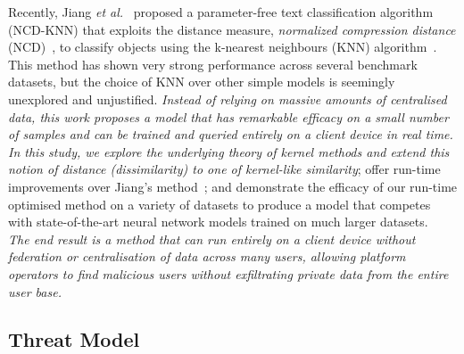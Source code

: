 \documentclass[conference]{IEEEtran}
\newcommand{\cm}[1]{\textit{{\color{blue}#1}}}
\begin{document}
Recently, Jiang \textit{et al.}~\cite{jiang2022less} proposed a parameter-free text classification algorithm (NCD-KNN) that exploits the distance measure, \textit{normalized compression distance} (NCD)~\cite{ncd},  to classify objects using the k-nearest neighbours (KNN) algorithm~\cite{shalev2014understanding}.
This method has shown very strong performance across several benchmark datasets, but the choice of KNN over other simple models is seemingly unexplored and unjustified. 
\cm{
Instead of relying on massive amounts of centralised data, this work proposes a model that has remarkable efficacy on a small number of samples and can be trained and queried entirely on a client device in real time.
In this study, we explore the underlying theory of kernel methods and extend this notion of distance (dissimilarity) to one of kernel-like similarity}; offer run-time improvements over Jiang's method~\cite{jiang2022less}; and demonstrate the efficacy of our run-time optimised method on a variety of datasets to produce a model that competes with state-of-the-art neural network models trained on much larger datasets. 
~\cm{
The end result is a method that can run entirely on a client device without federation or centralisation of data across many users, allowing platform operators to find malicious users without exfiltrating private data from the entire user base.
}




\subsection{Threat Model}
\label{threat}
\end{document}
